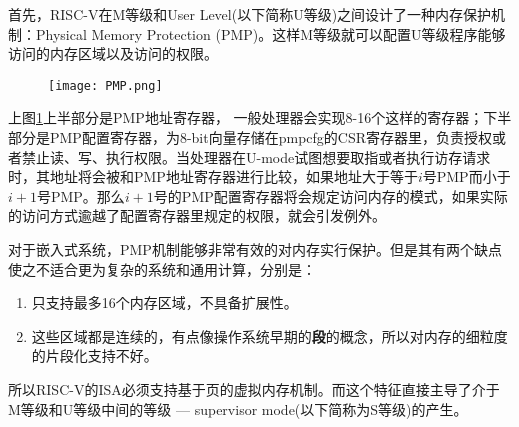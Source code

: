 \begin{enumerate}
	首先，RISC-V在M等级和User Level(以下简称U等级)之间设计了一种内存保护机制：Physical Memory Protection (PMP)。这样M等级就可以配置U等级程序能够访问的内存区域以及访问的权限。
	\begin{figure}[!htbp]
		\centering
		\texttt{[image: PMP.png]}
		\label{fig:pmp}
	\end{figure}
	上图\ref{fig:pmp}上半部分是PMP地址寄存器， 一般处理器会实现8-16个这样的寄存器；下半部分是PMP配置寄存器，为8-bit向量存储在pmpcfg的CSR寄存器里，负责授权或者禁止读、写、执行权限。当处理器在U-mode试图想要取指或者执行访存请求时，其地址将会被和PMP地址寄存器进行比较，如果地址大于等于$ i $号PMP而小于$ i+1 $号PMP。那么$ i+1 $号的PMP配置寄存器将会规定访问内存的模式，如果实际的访问方式逾越了配置寄存器里规定的权限，就会引发例外\citep{Patterson:2017:RRO:3202479}。
	
	对于嵌入式系统，PMP机制能够非常有效的对内存实行保护。但是其有两个缺点使之不适合更为复杂的系统和通用计算，分别是：
	\begin{enumerate}[label=(\alph*)]
		\item 只支持最多16个内存区域，不具备扩展性。
		\item 这些区域都是连续的，有点像操作系统早期的\textbf{段}的概念，所以对内存的细粒度的片段化支持不好。
	\end{enumerate}
	
	所以RISC-V的ISA必须支持基于页的虚拟内存机制。而这个特征直接主导了介于M等级和U等级中间的等级 --- supervisor mode(以下简称为S等级)的产生。
	

\end{enumerate}
